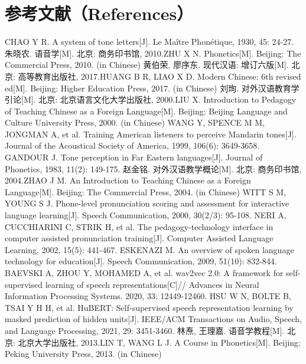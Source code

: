 \documentclass[UTF8,a4paper,twocolumn]{ctexart}
\makeatletter
\newcommand{\reffont}{\fontsize{9pt}{12pt}\selectfont}
\renewenvironment{thebibliography}[1]{%
  \section*{参考文献（References）}%
  \reffont
  \list{[\arabic{enumiv}]}{%
    \settowidth\labelwidth{[#1]}%
    \leftmargin=1.8em
    \labelsep=0.45em
    \itemindent=0pt
    \itemsep=0pt
    \parsep=0pt
    \usecounter{enumiv}%
    \let\p@enumiv\@empty
    \renewcommand\theenumiv{\arabic{enumiv}}}%
  \sloppy\clubpenalty4000\widowpenalty4000}
  {\def\@noitemerr{\@latex@warning{Empty `thebibliography' environment}}\endlist}
\makeatother
\begin{document}
\balance
\begin{thebibliography}{99}
 CHAO Y R. A system of tone letters[J]. Le Maître Phonétique, 1930, 45: 24-27.
 朱晓农. 语音学[M]. 北京: 商务印书馆, 2010.\newline ZHU X N. Phonetics[M]. Beijing: The Commercial Press, 2010. (in Chinese)
 黄伯荣, 廖序东. 现代汉语: 增订六版[M]. 北京: 高等教育出版社, 2017.\newline HUANG B R, LIAO X D. Modern Chinese: 6th revised ed[M]. Beijing: Higher Education Press, 2017. (in Chinese)
 刘珣. 对外汉语教育学引论[M]. 北京: 北京语言文化大学出版社, 2000.\newline LIU X. Introduction to Pedagogy of Teaching Chinese as a Foreign Language[M]. Beijing: Beijing Language and Culture University Press, 2000. (in Chinese)
 WANG Y, SPENCE M M, JONGMAN A, et al. Training American listeners to perceive Mandarin tones[J]. Journal of the Acoustical Society of America, 1999, 106(6): 3649-3658.
 GANDOUR J. Tone perception in Far Eastern languages[J]. Journal of Phonetics, 1983, 11(2): 149-175.
 赵金铭. 对外汉语教学概论[M]. 北京: 商务印书馆, 2004.\newline ZHAO J M. An Introduction to Teaching Chinese as a Foreign Language[M]. Beijing: The Commercial Press, 2004. (in Chinese)
 WITT S M, YOUNG S J. Phone-level pronunciation scoring and assessment for interactive language learning[J]. Speech Communication, 2000, 30(2/3): 95-108.
 NERI A, CUCCHIARINI C, STRIK H, et al. The pedagogy-technology interface in computer assisted pronunciation training[J]. Computer Assisted Language Learning, 2002, 15(5): 441-467.
 ESKENAZI M. An overview of spoken language technology for education[J]. Speech Communication, 2009, 51(10): 832-844.
 BAEVSKI A, ZHOU Y, MOHAMED A, et al. wav2vec 2.0: A framework for self-supervised learning of speech representations[C]// Advances in Neural Information Processing Systems. 2020, 33: 12449-12460.
 HSU W N, BOLTE B, TSAI Y H H, et al. HuBERT: Self-supervised speech representation learning by masked prediction of hidden units[J]. IEEE/ACM Transactions on Audio, Speech, and Language Processing, 2021, 29: 3451-3460.
 林焘, 王理嘉. 语音学教程[M]. 北京: 北京大学出版社, 2013.\newline LIN T, WANG L J. A Course in Phonetics[M]. Beijing: Peking University Press, 2013. (in Chinese)

\end{thebibliography}
\end{document}
